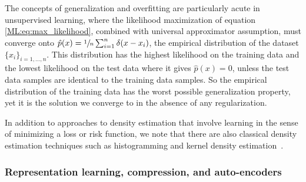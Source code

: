 
The concepts of generalization and overfitting are
particularly acute in unsupervised learning, where 
the likelihood maximization of equation \ref{ML:eq:max_likelihood},  
combined with universal approximator assumption, must converge onto  $\hat{p}(x) = \sfrac{1}{n} \sum_{i=1}^n \delta(x - x_i)$, the empirical distribution of the dataset $\{x_i\}_{i=1,\dots,n}$.
This distribution has the highest likelihood on the training data and the lowest likelihood on the 
test data where it gives $\hat{p}(x)=0$, unless the test data samples are identical to the 
training data samples. So the empirical distribution of the training data has the worst possible generalization property, yet 
it is the solution we converge to in the absence of 
any regularization. 

In addition to approaches to density estimation that involve learning in the sense of minimizing a loss or risk function, we note that there are also classical density estimation techniques such as histogramming and kernel density estimation~\cite{parzen1962estimation, davis2011remarks,Cranmer:2000du}. 

\subsubsection{Representation learning, compression, and auto-encoders}\label{ML:sec:representation}



